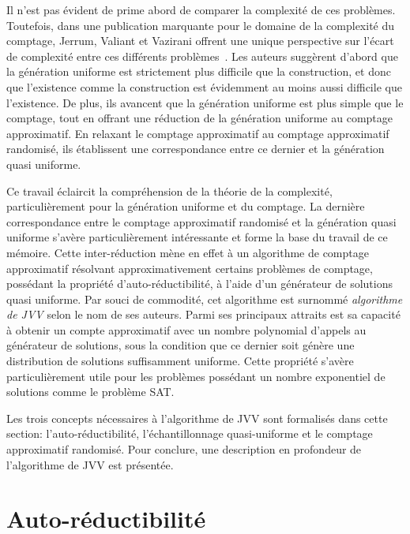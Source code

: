 Il n'est pas évident de prime abord de comparer la complexité de ces problèmes. Toutefois, dans une publication marquante pour le domaine de la complexité du comptage, Jerrum, Valiant et Vazirani offrent une unique perspective sur l'écart de complexité entre ces différents problèmes~\cite{jerrumRandomGenerationCombinatorial1986}. Les auteurs suggèrent d'abord que la génération uniforme est strictement plus difficile que la construction, et donc que l'existence comme la construction est évidemment au moins aussi difficile que l'existence. De plus, ils avancent que la génération uniforme est plus simple que le comptage, tout en offrant une réduction de la génération uniforme au comptage approximatif. En relaxant le comptage approximatif au comptage approximatif randomisé, ils établissent une correspondance entre ce dernier et la génération quasi uniforme.

Ce travail éclaircit la compréhension de la théorie de la complexité, particulièrement pour la génération uniforme et du comptage. La dernière correspondance entre le comptage approximatif randomisé et la génération quasi uniforme s'avère particulièrement intéressante et forme la base du travail de ce mémoire. Cette inter-réduction mène en effet à un algorithme de comptage approximatif résolvant approximativement certains problèmes de comptage, possédant la propriété d'auto-réductibilité, à l'aide d'un générateur de solutions quasi uniforme. Par souci de commodité, cet algorithme est surnommé \textit{algorithme de JVV} selon le nom de ses auteurs. Parmi ses principaux attraits est sa capacité à obtenir un compte approximatif avec un nombre polynomial d'appels au générateur de solutions, sous la condition que ce dernier soit génère une distribution de solutions suffisamment uniforme. Cette propriété s'avère particulièrement utile pour les problèmes possédant un nombre exponentiel de solutions comme le problème SAT.

Les trois concepts nécessaires à l'algorithme de JVV sont formalisés dans cette section: l'auto-réductibilité, l'échantillonnage quasi-uniforme et le comptage approximatif randomisé. Pour conclure, une description en profondeur de l'algorithme de JVV est présentée.


\section{Auto-réductibilité}
\label{sec:auto-reductibilite}
 
